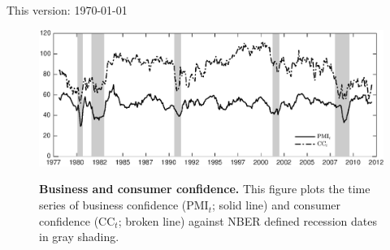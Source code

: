 \documentclass[12pt,a4paper,onecolumn,oneside,notitlepage]{article}
\begin{document}
\begin{titlepage}
\begin{center}
        \vspace{1.2cm}
        {
            \normalsize  
            \vspace{1.5cm}
            This version: \today
        }
        \clearpage
        \thispagestyle{empty}
        \vspace*{2cm}
        \mytitle
        \vspace*{0.5cm}
        \begin{singlespace}
            \begin{abstract}
                \noindent We study the role of sentiment variables as predictors for US recessions. We combine sentiment variables with either classical recession predictors or common factors based on a large panel of macroeconomic and financial variables. Sentiment variables hold vast predictive power for US recessions in excess of both the classical recession predictors and the common factors. The strong importance of the sentiment variables is documented both in-sample and out-of-sample.\\\bigskip
                \noindent\textbf{Keywords:} Business cycles, Forecasting, Factor analysis, Probit model, Sentiment variables\\\medskip
                \noindent\textbf{JEL Classification:} C22, C25, E32, E37, G17. \\\bigskip
                \noindent\textbf{This version:} \today
            \end{abstract}
        \end{singlespace}
    \end{center}        
\end{titlepage}


\clearpage
\begin{figure}[htbp]
    \caption{
        \textbf{Business and consumer confidence.} \newline 
        This figure plots the time series of business confidence (PMI$_{t}$; solid line) and consumer confidence (CC$_{t}$; broken line) against NBER defined recession dates in gray shading.
    }
    \centering
    \includegraphics[width=\textwidth]{Figures/Figure1.eps} 
    \label{fig:busconindex}
\end{figure}
\end{document}
